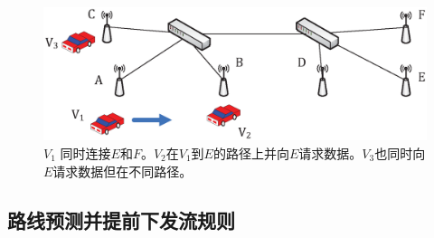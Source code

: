

\begin{figure} [t]
\begin{center}
\includegraphics[width=1\columnwidth]{figures/fig-4-31.eps}

\caption{$V_{1}$ 同时连接$E$和$F$。$V_{2}$在$V_{1}$到$E$的路径上并向$E$请求数据。$V_{3}$也同时向$E$请求数据但在不同路径。} \label{fig4}
\end{center}
\end{figure}

\subsection{路线预测并提前下发流规则} \label{Predict the path}

